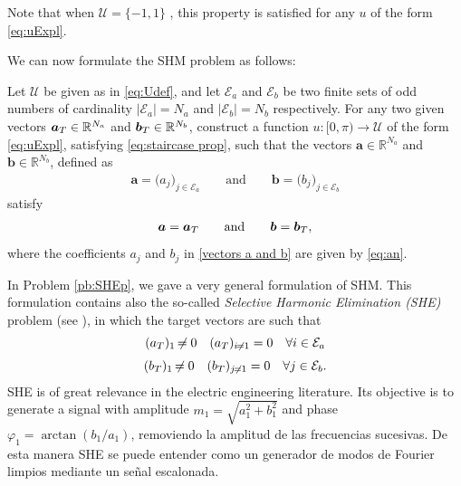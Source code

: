 \documentclass[twocolumn]{autart}    %
\begin{document}
Note that when $\mathcal{U} = \{-1,1\}$ , this property is satisfied for any $u$ of the form \eqref{eq:uExpl}.

We can now formulate the SHM problem as follows:

\bigskip

\begin{problem}[SHM]\label{pb:SHEp}
Let $\mathcal{U}$ be given as in \eqref{eq:Udef}, and let $\mathcal{E} _a $ and $\mathcal{E} _b $ be two finite sets of odd numbers of cardinality $|\mathcal{E}_a| = N_a $ and $ |\mathcal{E} _b| = N_b$ respectively. For any two given vectors $\aT \in \mathbb{R}^{N_a}$ and $\bT \in \mathbb{R}^{N_b} $, construct a function $u: [0,\pi)\to\mathcal{U}$ of the form \eqref{eq:uExpl}, satisfying \eqref{eq:staircase prop}, such that the vectors $\bm{a} \in \mathbb{R}^{N_a}$ and $\bm{b} \in \mathbb{R}^{N_b}$, defined as
\begin{align}\label{vectors a and b}
	\bm{a} = \big( a_j \big)_{j\in \mathcal{E}_a} \qquad \text{and} \qquad
	\bm{b} = \big( b_j \big)_{j\in \mathcal{E}_b}
\end{align}
satisfy
\begin{align*} 
	\bm{a} = \aT \qquad \text{and} \qquad \bm{b} = \bT,
\end{align*}
where the coefficients $a_j$ and $b_j$ in \eqref{vectors a and b} are given by \eqref{eq:an}.
\end{problem}  
\vspace{1em}

\JOStart
\begin{remark}[SHE]\label{remark:SHE}
In Problem \ref{pb:SHEp}, we gave a very general formulation of SHM. This formulation contains also the so-called \emph{Selective Harmonic Elimination (SHE)} problem (see \cite{Sun1996}), in which the target vectors are such that 
\begin{gather}
	\notag (a_T)_1 \neq 0  \hspace{1em} (a_T)_{i\neq1} = 0 \hspace{1em} \forall i \in \mathcal{E}_a 
	\\[3pt]
	\notag (b_T)_1 \neq 0  \hspace{1em} (b_T)_{j\neq1} = 0 \hspace{1em} \forall j \in \mathcal{E}_b. 
\end{gather}
SHE is of great relevance in the electric engineering literature. Its objective is to generate a signal with amplitude $m_1 = \sqrt{a_1^2+b_1^2}$ and phase $\varphi_1=\arctan(b_1/a_1)$, removiendo la amplitud de las frecuencias sucesivas. De esta manera SHE se puede entender como un generador de  modos de Fourier limpios mediante un señal escalonada.
\end{remark}
\JOEnd
\end{document}
